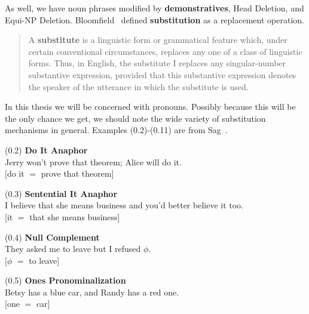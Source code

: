 \documentclass{article}
\begin{document}
As well, we have noun phrases modified by \textbf{demonstratives},
Head Deletion, and Equi-NP Deletion.
Bloomfield~\cite{Bloomfield33} defined 
\textbf{substitution} as a replacement operation.

\begin{quote}
A \textbf{substitute} is a linguistic form or grammatical
feature which, under certain conventional circumstances,
replaces any one of a class of linguistic forms. Thus, in
English, the substitute I replaces any singular-number
substantive expression, provided that this substantive
expression denotes the speaker of the utterance in which the
substitute is used.
\end{quote}

In this thesis we will be concerned with pronouns.  Possibly
because this will be the only chance we get, we should note the
wide variety of substitution mechanisms in general. Examples
(0.2)-(0.11) are from Sag~\cite{Sag79}.

\begin{enumerate*}
\item[(0.2)] \textbf{Do It Anaphor}\\
Jerry won't prove that theorem; Alice will do it.\\
{}[do it ${=}$ prove that theorem]
\end{enumerate*}

\begin{enumerate*}
\item[(0.3)] \textbf{Sentential It Anaphor}\\
I believe that she means business and you'd better believe it
too.\\
{}[it ${=}$ that she means business]
\end{enumerate*}

\begin{enumerate*}
\item[(0.4)] \textbf{Null Complement}\\
They asked me to leave but I refused ${\phi}$.\\
{}[${\phi}$ ${=}$ to leave]
\end{enumerate*}

\begin{enumerate*}
\item[(0.5)] \textbf{Ones Pronominalization}\\
Betsy has a blue car, and Randy has a red one.\\
{}[one ${=}$ car]
\end{enumerate*}
\end{document}
